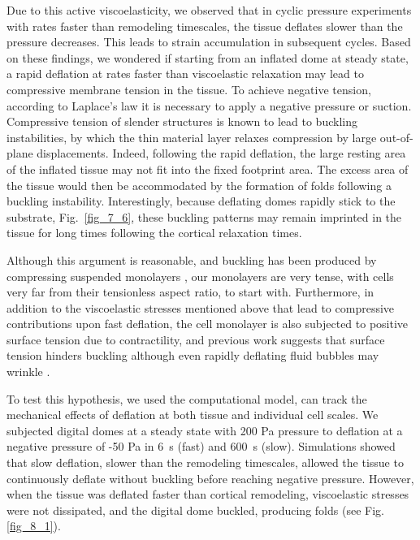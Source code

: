 Due to this active viscoelasticity, we observed that in cyclic pressure experiments with rates faster than remodeling timescales, the tissue deflates slower than the pressure decreases. This leads to strain accumulation in subsequent cycles. Based on these findings, we wondered if starting from an inflated dome at steady state, a rapid deflation at rates faster than viscoelastic relaxation may lead to compressive membrane tension in the tissue.  To achieve negative tension, according to Laplace's law it is necessary to apply a negative pressure or suction. Compressive tension of slender structures is known to lead to buckling instabilities, by which the thin material layer relaxes compression by large out-of-plane displacements. Indeed, following the rapid deflation, the large resting area of the inflated tissue may not fit into the fixed footprint area. The excess area of the tissue would then be accommodated by the formation of folds following a buckling instability. Interestingly, because deflating domes rapidly stick to the substrate, Fig.~\ref{fig_7_6}, these buckling patterns may remain imprinted in the tissue for long times following the cortical relaxation times. 


Although this argument is reasonable, and buckling has been produced by compressing suspended monolayers \cite{wyatt2020}, our monolayers are very tense, with cells very far from their tensionless aspect ratio, to start with. Furthermore, in addition to the viscoelastic stresses mentioned above that lead to compressive contributions upon fast deflation, the cell monolayer is also subjected to positive surface tension due to contractility, and  previous work suggests that surface tension hinders buckling \cite{PhysRevLett.109.064502} although even rapidly deflating fluid bubbles may wrinkle \cite{doi:10.1126/science.aba0593}. 

To test this hypothesis, we used the computational model, can track the mechanical effects of deflation at both tissue and individual cell scales. We subjected digital domes at a steady state with 200 Pa pressure to deflation at a negative pressure of -50 Pa in 6~s (fast) and 600~s (slow). Simulations showed that slow deflation, slower than the remodeling timescales, allowed the tissue to continuously deflate without buckling before reaching negative pressure. However, when the tissue was deflated faster than cortical remodeling, viscoelastic stresses were not dissipated, and the digital dome buckled, producing folds (see Fig. \ref{fig_8_1}).

